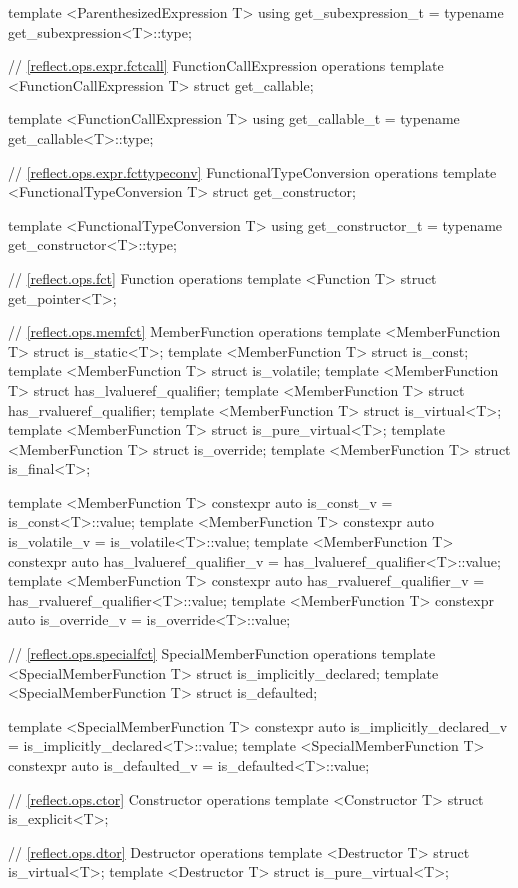 \begin{std.txt}
\begin{codeblock}
{{template <ParenthesizedExpression T>
   using get_subexpression_t = typename get_subexpression<T>::type;

// \ref{reflect.ops.expr.fctcall} FunctionCallExpression operations
template <FunctionCallExpression T> struct get_callable;

template <FunctionCallExpression T>
  using get_callable_t = typename get_callable<T>::type;

// \ref{reflect.ops.expr.fcttypeconv} FunctionalTypeConversion operations
template <FunctionalTypeConversion T> struct get_constructor;

template <FunctionalTypeConversion T>
  using get_constructor_t = typename get_constructor<T>::type;

// \ref{reflect.ops.fct} Function operations
template <Function T> struct get_pointer<T>;

// \ref{reflect.ops.memfct} MemberFunction operations
template <MemberFunction T> struct is_static<T>;
template <MemberFunction T> struct is_const;
template <MemberFunction T> struct is_volatile;
template <MemberFunction T> struct has_lvalueref_qualifier;
template <MemberFunction T> struct has_rvalueref_qualifier;
template <MemberFunction T> struct is_virtual<T>;
template <MemberFunction T> struct is_pure_virtual<T>;
template <MemberFunction T> struct is_override;
template <MemberFunction T> struct is_final<T>;

template <MemberFunction T>
  constexpr auto is_const_v = is_const<T>::value;
template <MemberFunction T>
  constexpr auto is_volatile_v = is_volatile<T>::value;
template <MemberFunction T>
  constexpr auto has_lvalueref_qualifier_v = has_lvalueref_qualifier<T>::value;
template <MemberFunction T>
  constexpr auto has_rvalueref_qualifier_v = has_rvalueref_qualifier<T>::value;
template <MemberFunction T>
  constexpr auto is_override_v = is_override<T>::value;

// \ref{reflect.ops.specialfct} SpecialMemberFunction operations
template <SpecialMemberFunction T> struct is_implicitly_declared;
template <SpecialMemberFunction T> struct is_defaulted;

template <SpecialMemberFunction T>
  constexpr auto is_implicitly_declared_v = is_implicitly_declared<T>::value;
template <SpecialMemberFunction T>
  constexpr auto is_defaulted_v = is_defaulted<T>::value;

// \ref{reflect.ops.ctor} Constructor operations
template <Constructor T> struct is_explicit<T>;

// \ref{reflect.ops.dtor} Destructor operations
template <Destructor T> struct is_virtual<T>;
template <Destructor T> struct is_pure_virtual<T>;

}}
\end{codeblock}
\end{std.txt}
